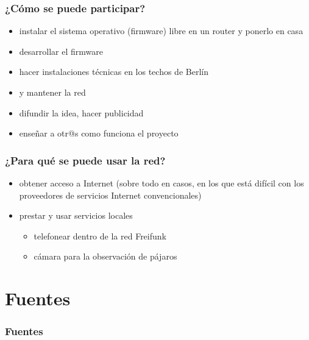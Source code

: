 \documentclass[12pt, xcolor=table]{beamer}
\begin{document}
\begin{frame}
  \frametitle{¿Cómo se puede participar?}
  \begin{itemize}
    \item instalar el sistema operativo (firmware) libre en un router y ponerlo en casa
    \item desarrollar el firmware
    \item hacer instalaciones técnicas en los techos de Berlín
    \item y mantener la red
    \item difundir la idea, hacer publicidad
    \item enseñar a otr@s como funciona el proyecto
  \end{itemize}
\end{frame}

\begin{frame}
  \frametitle{¿Para qué se puede usar la red?}
  \begin{itemize}
    \item obtener acceso a Internet (sobre todo en casos, en los que está difícil con los proveedores de servicios Internet convencionales)
    \item prestar y usar servicios locales
      \begin{itemize}
        \item telefonear dentro de la red Freifunk
        \item cámara para la observación de pájaros
      \end{itemize}
  \end{itemize}
\end{frame}

\section{Fuentes}
\begin{frame}
  \frametitle{Fuentes}
  \nocite{*}
  
  
\end{frame}
\end{document}
